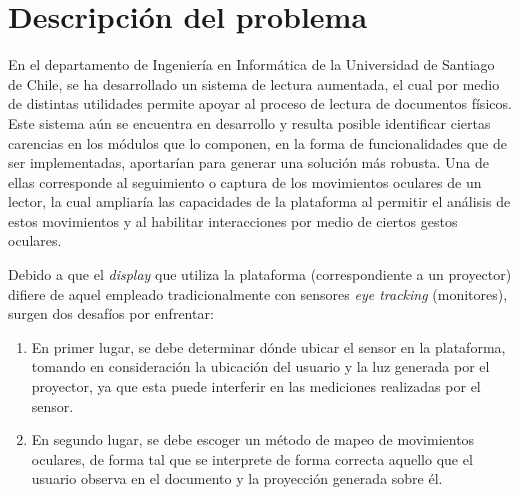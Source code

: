 \section{Descripci\'on del problema}
\label{intro:problema}

En el departamento de Ingeniería en Informática de la Universidad de Santiago de Chile, se ha desarrollado un sistema de lectura aumentada, el cual por medio de distintas utilidades permite apoyar al proceso de lectura de documentos físicos. Este sistema aún se encuentra en desarrollo y resulta posible identificar ciertas carencias en los módulos que lo componen, en la forma de funcionalidades que de ser implementadas, aportarían para generar una solución más robusta. Una de ellas corresponde al seguimiento o captura de los movimientos oculares de un lector, la cual ampliaría las capacidades de la plataforma al permitir el análisis de estos movimientos y al habilitar interacciones por medio de ciertos gestos oculares.

Debido a que el \textit{display} que utiliza la plataforma (correspondiente a un proyector) difiere de aquel empleado tradicionalmente con sensores \textit{eye tracking} (monitores), surgen dos desafíos por enfrentar:
\begin{enumerate}
    \item En primer lugar, se debe determinar dónde ubicar el sensor en la plataforma, tomando en consideración la ubicación del usuario y la luz generada por el proyector, ya que esta puede interferir en las mediciones realizadas por el sensor.
    \item En segundo lugar, se debe escoger un método de mapeo de movimientos oculares, de forma tal que se interprete de forma correcta aquello que el usuario observa en el documento y la proyección generada sobre él.
\end{enumerate}

